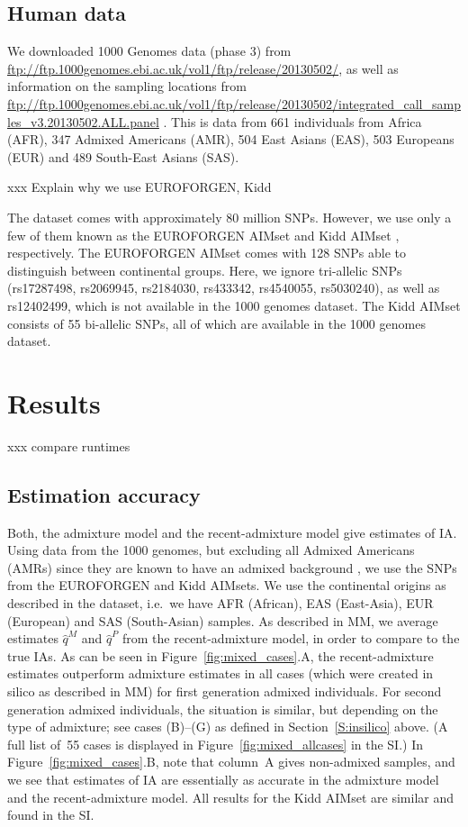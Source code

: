 \documentclass[12pt]{article}
\theoremstyle{definition}
\begin{document}
\subsection{Human data}
\sloppy We downloaded 1000 Genomes data (phase 3) from
\url{ftp://ftp.1000genomes.ebi.ac.uk/vol1/ftp/release/20130502/}, as
well as information on the sampling locations from
\url{ftp://ftp.1000genomes.ebi.ac.uk/vol1/ftp/release/20130502/integrated_call_samples_v3.20130502.ALL.panel}
\cite{Auton2015}. This is data from 661 individuals from Africa (AFR),
347 Admixed Americans (AMR), 504 East Asians (EAS), 503 Europeans
(EUR) and 489 South-East Asians (SAS).

xxx Explain why we use EUROFORGEN, Kidd

The dataset comes with approximately 80 million SNPs.  However, we use
only a few of them known as the EUROFORGEN AIMset \cite{Phillips2014}
and Kidd AIMset \cite{Kidd2014}, respectively. The EUROFORGEN AIMset
comes with 128 SNPs able to distinguish between continental
groups. Here, we ignore tri-allelic SNPs (rs17287498, rs2069945,
rs2184030, rs433342, rs4540055, rs5030240), as well as rs12402499,
which is not available in the 1000 genomes dataset. The Kidd AIMset
consists of 55 bi-allelic SNPs, all of which are available in the 1000
genomes dataset.

\section{Results}

xxx compare runtimes

\subsection{Estimation accuracy}
Both, the admixture model and the recent-admixture model give
estimates of IA. Using data from the 1000 genomes, but excluding all
Admixed Americans (AMRs) since they are known to have an admixed
background \cite{Eduardoff2016, Pfaffelhuber2019}, we use the SNPs
from the EUROFORGEN and Kidd AIMsets. We use the continental origins
as described in the dataset, i.e.\ we have AFR (African), EAS
(East-Asia), EUR (European) and SAS (South-Asian) samples. As
described in MM, we average estimates $\hat q^M$ and $\hat q^P$ from
the recent-admixture model, in order to compare to the true IAs. As
can be seen in Figure~\ref{fig:mixed_cases}.A, the recent-admixture
estimates outperform admixture estimates in all cases (which were
created in silico as described in MM) for first generation admixed
individuals. For second generation admixed individuals, the situation
is similar, but depending on the type of admixture; see cases (B)--(G)
as defined in Section~\ref{S:insilico} above. (A full list of~55 cases
is displayed in Figure~\ref{fig:mixed_allcases} in the SI.) In
Figure~\ref{fig:mixed_cases}.B, note that column~A gives non-admixed
samples, and we see that estimates of IA are essentially as accurate
in the admixture model and the recent-admixture model. All results for
the Kidd AIMset are similar and found in the SI.
\end{document}
